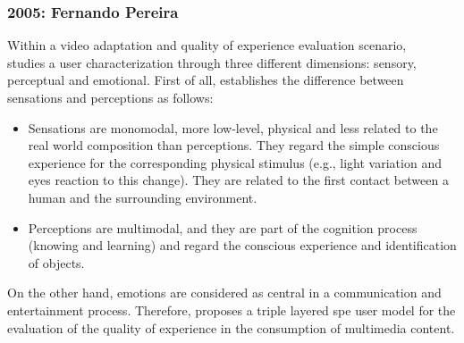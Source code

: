 \subsubsection{2005: Fernando Pereira}
\label{sec:pereira}

Within a video adaptation and quality of experience evaluation scenario,
~\citet{pereira_triple_2005} studies a user characterization through three
different dimensions: sensory, perceptual and emotional. First of all,
\citeauthor{pereira_triple_2005} establishes the difference between sensations 
and perceptions as follows:

\begin{itemize}
  \item Sensations are monomodal, more low-level, physical and less related to
  the real world composition than perceptions. They regard the simple conscious
  experience for the corresponding physical stimulus (e.g., light variation and
  eyes reaction to this change). They are related to the first contact between a
  human and the surrounding environment.
  
  \item Perceptions are multimodal, and they are part of the cognition process
  (knowing and learning) and regard the conscious experience and identification
  of objects.
\end{itemize}

On the other hand, emotions are considered as central in a communication and 
entertainment process. Therefore, \citeauthor{pereira_triple_2005} proposes a 
triple layered \ac{spe} user model for the evaluation of the quality of 
experience in the consumption of multimedia content.



